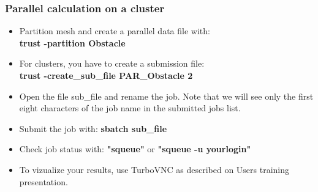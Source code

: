 \documentclass[10pt, hyperref={unicode=true,pdfusetitle, bookmarks=true,bookmarksnumbered=false,bookmarksopen=false, breaklinks=false,pdfborder={0 0l 1},backref=true,colorlinks=true,linkcolor=darkblue,pageanchor}]{beamer}
\begin{document}
\begin{frame}
\frametitle{Parallel calculation on a cluster}
\begin{block}{}

\begin{itemize}
\item Partition mesh and create a parallel data file with:\\
\textbf{trust -partition Obstacle}

\item For clusters, you have to create a submission file:\\
\textbf{trust -create\_sub\_file PAR\_Obstacle 2}

\item Open the file sub\_file and rename the job. Note that we will see only the first eight characters of the job name in the submitted jobs list.

\item Submit the job with: 
\textbf{sbatch sub\_file}

\item Check job status with: \textbf{"squeue"} or \textbf{"squeue -u yourlogin"}

\item To vizualize your results, use TurboVNC as described on Users training presentation.

\end{itemize}

\end{block}
\end{frame}
\end{document}
